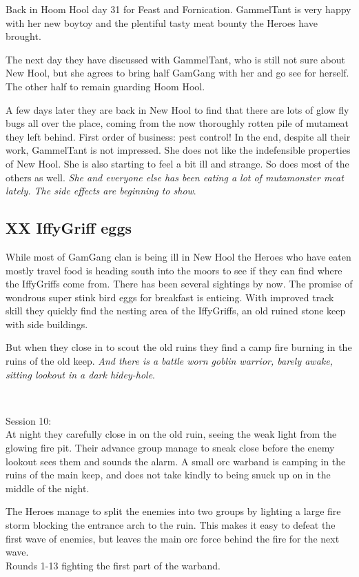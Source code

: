 Back in Hoom Hool day 31 for Feast and Fornication. GammelTant is very happy with her new boytoy and the plentiful tasty meat bounty the Heroes have brought.

The next day they have discussed with GammelTant, who is still not sure about New Hool, but she agrees to bring half GamGang with her and go see for herself. The other half to remain guarding Hoom Hool.

A few days later they are back in New Hool to find that there are lots of glow fly bugs all over the place, coming from the now thoroughly rotten pile of mutameat they left behind. First order of business: pest control! 
In the end, despite all their work, GammelTant is not impressed. She does not like the indefensible properties of New Hool. She is also starting to feel a bit ill and strange. So does most of the others as well. \textit{She and everyone else has been eating a lot of mutamonster meat lately. The side effects are beginning to show}.


\subsection*{XX IffyGriff eggs}

While most of GamGang clan is being ill in New Hool the Heroes who have eaten mostly travel food is heading south into the moors to see if they can find where the IffyGriffs come from. There has been several sightings by now. The promise of wondrous super stink bird eggs for breakfast is enticing. With improved track skill they quickly find the nesting area of the IffyGriffs, an old ruined stone keep with side buildings.

But when they close in to scout the old ruins they find a camp fire burning in the ruins of the old keep. \textit{And there is a battle worn goblin warrior, barely awake, sitting lookout in a dark hidey-hole}.

\

Session 10:\\                                                           %
At night they carefully close in on the old ruin, seeing the weak light from the glowing fire pit. Their advance group manage to sneak close before the enemy lookout sees them and sounds the alarm. A small orc warband is camping in the ruins of the main keep, and does not take kindly to being snuck up on in the middle of the night.

The Heroes manage to split the enemies into two groups by lighting a large fire storm blocking the entrance arch to the ruin. This makes it easy to defeat the first wave of enemies, but leaves the main orc force behind the fire for the next wave.\\
Rounds 1-13 fighting the first part of the warband.

